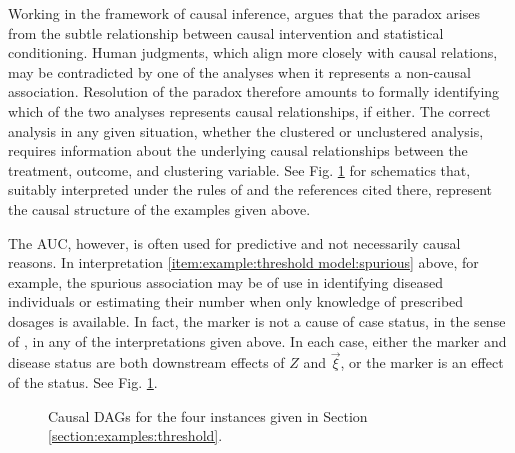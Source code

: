 \documentclass[12pt]{article}
\begin{document}
Working in the framework of causal inference, \citet{pearl2014} argues
that the paradox arises from the subtle relationship between
causal intervention and statistical conditioning. Human judgments, which align more closely with causal relations, may be contradicted by one of the analyses when it represents a non-causal association. Resolution of the paradox therefore amounts to
formally identifying which of the two analyses represents causal relationships, if either. The correct analysis
in any given situation, whether the clustered or unclustered analysis,
requires information about the underlying causal relationships between
the treatment, outcome, and clustering variable. See Fig. \ref{fig:dags} for schematics that, suitably interpreted under the rules of \citet{pearl2014} and the references cited there, represent the causal structure of the examples given above.

The AUC, however, is often used for predictive and not necessarily causal reasons. In interpretation \ref{item:example:threshold model:spurious} above, for example, the spurious association may be of use in identifying diseased individuals or estimating their number when only knowledge of prescribed dosages is available. In fact, the marker is not a cause of case status, in the sense of \citet{pearl2014}, in any of the interpretations given above. In each case, either the marker and disease status are both downstream effects of $Z$ and $\vec{\xi}$, or the marker is an effect of the status. See Fig. \ref{fig:dags}.

\begin{figure}
\caption{Causal DAGs for the four instances given in Section \ref{section:examples:threshold}.}\label{fig:dags}
\end{figure}
\end{document}
